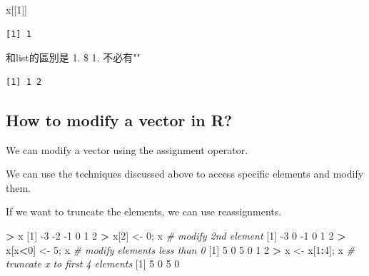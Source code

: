 \documentclass[]{book}
\newenvironment{Shaded}{\begin{snugshade}}{\end{snugshade}}
\newcommand{\CommentTok}[1]{\textcolor[rgb]{0.56,0.35,0.01}{\textit{#1}}}
\newcommand{\DataTypeTok}[1]{\textcolor[rgb]{0.13,0.29,0.53}{#1}}
\newcommand{\DecValTok}[1]{\textcolor[rgb]{0.00,0.00,0.81}{#1}}
\newcommand{\KeywordTok}[1]{\textcolor[rgb]{0.13,0.29,0.53}{\textbf{#1}}}
\newcommand{\NormalTok}[1]{#1}
\newcommand{\OperatorTok}[1]{\textcolor[rgb]{0.81,0.36,0.00}{\textbf{#1}}}
\newcommand{\StringTok}[1]{\textcolor[rgb]{0.31,0.60,0.02}{#1}}
\theoremstyle{definition}
\theoremstyle{definition}
\theoremstyle{definition}
\theoremstyle{remark}
\begin{document}
\begin{Shaded}
\begin{Highlighting}[]
\NormalTok{x[[}\DecValTok{1}\NormalTok{]]}
\end{Highlighting}
\end{Shaded}

\begin{verbatim}
[1] 1
\end{verbatim}

和list的區別是 1. \$ 1. 不必有""

\begin{Shaded}
\end{Shaded}

\begin{verbatim}
[1] 1 2
\end{verbatim}

\hypertarget{how-to-modify-a-vector-in-r}{%
\subsection{How to modify a vector in
R?}\label{how-to-modify-a-vector-in-r}}

We can modify a vector using the assignment operator.

We can use the techniques discussed above to access specific elements
and modify them.

If we want to truncate the elements, we can use reassignments.

\begin{Shaded}
\begin{Highlighting}[]
\OperatorTok{>}\StringTok{ }\NormalTok{x}
\NormalTok{[}\DecValTok{1}\NormalTok{] }\DecValTok{-3} \DecValTok{-2} \DecValTok{-1}  \DecValTok{0}  \DecValTok{1}  \DecValTok{2}
\OperatorTok{>}\StringTok{ }\NormalTok{x[}\DecValTok{2}\NormalTok{] <-}\StringTok{ }\DecValTok{0}\NormalTok{; x        }\CommentTok{# modify 2nd element}
\NormalTok{[}\DecValTok{1}\NormalTok{] }\DecValTok{-3}  \DecValTok{0} \DecValTok{-1}  \DecValTok{0}  \DecValTok{1}  \DecValTok{2}
\OperatorTok{>}\StringTok{ }\NormalTok{x[x}\OperatorTok{<}\DecValTok{0}\NormalTok{] <-}\StringTok{ }\DecValTok{5}\NormalTok{; x   }\CommentTok{# modify elements less than 0}
\NormalTok{[}\DecValTok{1}\NormalTok{] }\DecValTok{5} \DecValTok{0} \DecValTok{5} \DecValTok{0} \DecValTok{1} \DecValTok{2}
\OperatorTok{>}\StringTok{ }\NormalTok{x <-}\StringTok{ }\NormalTok{x[}\DecValTok{1}\OperatorTok{:}\DecValTok{4}\NormalTok{]; x      }\CommentTok{# truncate x to first 4 elements}
\NormalTok{[}\DecValTok{1}\NormalTok{] }\DecValTok{5} \DecValTok{0} \DecValTok{5} \DecValTok{0}
\end{Highlighting}
\end{Shaded}
\end{document}
